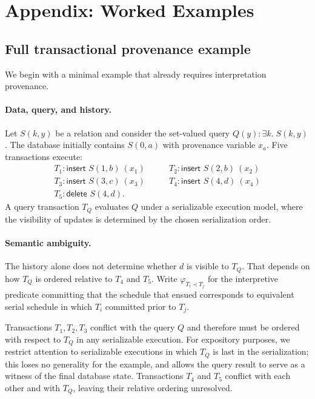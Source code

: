 \documentclass[acmsmall,nonacm]{acmart}
\theoremstyle{remark}
\numberwithin{definition}{section}
\numberwithin{theorem}{section}
\numberwithin{lemma}{section}
\numberwithin{corollary}{section}
\numberwithin{remark}{section}
\numberwithin{example}{section}
\numberwithin{observation}{section}
\numberwithin{assumption}{section}
\begin{document}
\appendix
\section{Appendix: Worked Examples}
\label{sec:appendix-examples}

\subsection{Full transactional provenance example}
\label{sec:appendix-concurrency}

We begin with a minimal example that already requires interpretation provenance.

\paragraph{Data, query, and history.}
Let $S(k,y)$ be a relation and consider the set-valued query $Q(y) : \exists k.\; S(k,y)$.
The database initially contains $S(0,a)$ with provenance variable $x_a$.
Five transactions execute:
\[
\begin{array}{ll}
T_1: \textsf{insert } S(1,b) \ (x_1) \qquad &
T_2: \textsf{insert } S(2,b) \ (x_2)\\
T_3: \textsf{insert } S(3,c) \ (x_3) \qquad &
T_4: \textsf{insert } S(4,d) \ (x_4)\\
T_5: \textsf{delete } S(4,d). &
\end{array}
\]
A query transaction $T_Q$ evaluates $Q$ under a
serializable execution model, where the visibility of updates is
determined by the chosen serialization order.

\paragraph{Semantic ambiguity.}
The history alone does not determine whether $d$ is visible to $T_Q$.
That depends on how $T_Q$ is ordered relative to $T_4$ and $T_5$.
Write $\varphi_{T_i \prec T_j}$ for the interpretive predicate committing
that the schedule that ensued corresponds to equivalent serial schedule in which
$T_i$ committed prior to $T_j$.

Transactions $T_1,T_2,T_3$ conflict with the query $Q$ and therefore must
be ordered with respect to $T_Q$ in any serializable execution. 
For expository purposes, we restrict attention to serializable executions
in which $T_Q$ is last in the serialization; this loses no generality for
the example, and allows the query result to serve as a witness of the final
database state.
Transactions $T_4$ and $T_5$ conflict with each other and with $T_Q$,
leaving their relative ordering unresolved.
\end{document}
